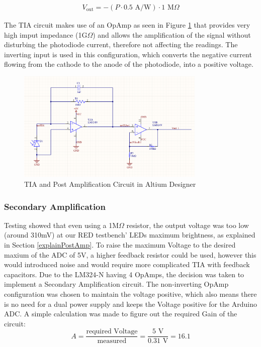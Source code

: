 \begin{equation} \label{eq:TIAoutputWithValues}
  \begin{split}
  V_{\text{out}} = -(P \cdot 0.5 \text{ A/W}) \cdot 1 \text{ M}\Omega
  \end{split}
\end{equation}

The \ac{TIA} circuit makes use of an \ac{OpAmp} as seen in Figure \ref{fig:AltiumDis} that provides very high imput impedance (1G$\Omega$) and allows the amplification of the signal without disturbing the photodiode current, therefore not affecting the readings. The inverting input is used in this configuration, which converts the negative current flowing from the cathode to the anode of the photodiode, into a positive voltage.

%
\begin{figure}[htbp] %
    \centering
    \includegraphics[width=0.8\textwidth]{chapters/methodology/prototype/AltiumSingleCircuit_wCap.png}
    \caption{TIA and Post Amplification Circuit in Altium Designer}
    \label{fig:AltiumDis}
  \end{figure}
%
%
\subsubsection{Secondary Amplification}
\label{secondAmp}  
Testing showed that even using a 1M$\Omega$ resistor, the output voltage was too low (around 310mV) at our \ac{RED} testbench' \acp{LED} maximum brightness, as explained in Section \ref{explainPostAmp}. To raise the maximum Voltage to the desired maxium of the ADC of 5V, a higher feedback resistor could be used, however this would introduced noise and would require more complicated TIA with feedback capacitors. Due to the LM324-N having 4 \acp{OpAmp}, the decision was taken to implement a Secondary Amplification circuit. The non-inverting \ac{OpAmp} configuration was chosen to maintain the voltage positive, which also means there is no need for a dual power supply and keeps the Voltage positive for the Arduino ADC.
A simple calculation was made to figure out the required Gain of the circuit:
\begin{equation} \label{gainCalc}
  A = \frac{\text{required Voltage}}{\text{measured}} = \frac{5\text{ V}}{0.31\text{ V}} = 16.1
  \end{equation}

